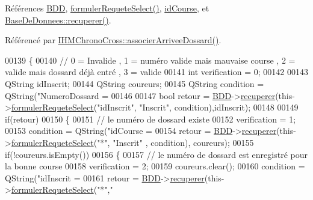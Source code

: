 Références \hyperlink{class_course_a28a58b06494361b7a7eb81844d571dd4}{B\+DD}, \hyperlink{class_course_a2ce9c62ead2c878a30af9d9c11b81644}{formuler\+Requete\+Select()}, \hyperlink{class_course_a1f80798e50be6db9911a882a2491c698}{id\+Course}, et \hyperlink{class_base_de_donnees_a77539baad389f5acf754cd2cd452403e}{Base\+De\+Donnees\+::recuperer()}.



Référencé par \hyperlink{class_i_h_m_chrono_cross_a9f7f1ad130b60300a879694b6234f161}{I\+H\+M\+Chrono\+Cross\+::associer\+Arrivee\+Dossard()}.


\begin{DoxyCode}
00139 \{
00140     \textcolor{comment}{// 0 = Invalide , 1 = numéro valide mais mauvaise course , 2 = valide mais dossard déjà entré , 3 =
       valide}
00141     \textcolor{keywordtype}{int} verification = 0;
00142 
00143     QString idInscrit;
00144     QString coureurs;
00145     QString condition = QString(\textcolor{stringliteral}{"NumeroDossard = %
00146 
00147     \textcolor{keywordtype}{bool} retour = \hyperlink{class_course_a28a58b06494361b7a7eb81844d571dd4}{BDD}->\hyperlink{class_base_de_donnees_a77539baad389f5acf754cd2cd452403e}{recuperer}(this->\hyperlink{class_course_a2ce9c62ead2c878a30af9d9c11b81644}{formulerRequeteSelect}(\textcolor{stringliteral}{"idInscrit"}, \textcolor{stringliteral}{
      "Inscrit"}, condition),idInscrit);
00148 
00149     \textcolor{keywordflow}{if}(retour)
00150     \{
00151         \textcolor{comment}{// le numéro de dossard existe}
00152         verification = 1;
00153         condition = QString(\textcolor{stringliteral}{"idCourse = %
00154         retour = \hyperlink{class_course_a28a58b06494361b7a7eb81844d571dd4}{BDD}->\hyperlink{class_base_de_donnees_a77539baad389f5acf754cd2cd452403e}{recuperer}(this->\hyperlink{class_course_a2ce9c62ead2c878a30af9d9c11b81644}{formulerRequeteSelect}(\textcolor{stringliteral}{"*"}, \textcolor{stringliteral}{"Inscrit"}
      , condition), coureurs);
00155         \textcolor{keywordflow}{if}(!coureurs.isEmpty())
00156         \{
00157             \textcolor{comment}{// le numéro de dossard est enregistré pour la bonne course}
00158             verification = 2;
00159             coureurs.clear();
00160             condition = QString(\textcolor{stringliteral}{"idInscrit = %
00161             retour = \hyperlink{class_course_a28a58b06494361b7a7eb81844d571dd4}{BDD}->\hyperlink{class_base_de_donnees_a77539baad389f5acf754cd2cd452403e}{recuperer}(this->\hyperlink{class_course_a2ce9c62ead2c878a30af9d9c11b81644}{formulerRequeteSelect}(\textcolor{stringliteral}{"*"},\textcolor{stringliteral}{"
}}}}
\end{DoxyCode}
